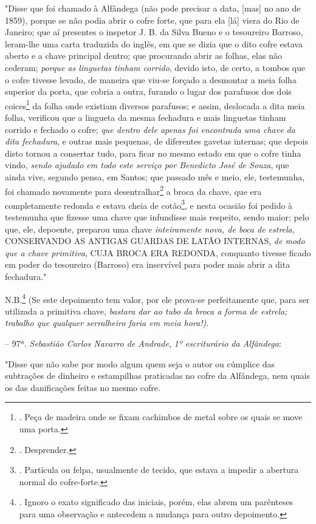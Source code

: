 "Disse que foi chamado à Alfândega (não pode precisar a data, {[}mas{]}
no ano de 1859), porque se não podia abrir o cofre forte, que para ela
{[}lá{]} viera do Rio de Janeiro; que aí presentes o inspetor J. B. da
Silva Bueno e o tesoureiro Barroso, leram-lhe uma carta traduzida do
inglês, em que se dizia que o dito cofre estava aberto e a chave
principal dentro; que procurando abrir as folhas, elas não cederam;
\emph{porque as linguetas tinham corrido}, devido isto, de certo, a
tombos que o cofre tivesse levado, de maneira que viu-se forçado a
desmontar a meia folha superior da porta, que cobria a outra, furando o
lugar dos parafusos dos dois coices\footnote{. Peça de madeira onde se
  fixam cachimbos de metal sobre os quais se move uma porta.} da folha
onde existiam diversos parafusos; e assim, deslocada a dita meia folha,
verificou que a lingueta da mesma fechadura e mais linguetas tinham
corrido e fechado o cofre; \emph{que dentro dele apenas foi encontrada
uma chave da dita fechadura}, e outras mais pequenas, de diferentes
gavetas internas; que depois disto tornou a consertar tudo, para ficar
no mesmo estado em que o cofre tinha vindo, \emph{sendo ajudado em todo
este serviço por Benedicto José de Souza}, que ainda vive, segundo
pensa, em Santos; que passado mês e meio, ele, testemunha, foi chamado
novamente para desentralhar\footnote{. Desprender.} a broca da chave,
que era completamente redonda e estava cheia de cotão\footnote{.
  Partícula ou felpa, usualmente de tecido, que estava a impedir a
  abertura normal do cofre-forte.}, e nesta ocasião foi pedido à
testemunha que fizesse uma chave que infundisse mais respeito, sendo
maior; pelo que, ele, depoente, preparou uma chave \emph{inteiramente
nova, de boca de estrela,} CONSERVANDO AS ANTIGAS GUARDAS DE LATÃO
INTERNAS, \emph{de modo que a chave primitiva}, CUJA BROCA ERA REDONDA,
conquanto tivesse ficado em poder do tesoureiro (Barroso) era inservível
para poder mais abrir a dita fechadura."

N.B.\footnote{. Ignoro o exato significado das iniciais, porém, elas
  abrem um parênteses para uma observação e antecedem a mudança para
  outro depoimento.} (Se este depoimento tem valor, por ele prova-se
perfeitamente que, para ser utilizada a primitiva chave, \emph{bastara
dar ao tubo da broca a forma de estrela; trabalho que qualquer
serralheiro faria em meia hora!)}.

-- 97ª. \emph{Sebastião Carlos Navarro de Andrade}, \emph{1º
escriturário da Alfândega}:

"Disse que não sabe por modo algum quem seja o autor ou cúmplice das
subtrações de dinheiro e estampilhas praticadas no cofre da Alfândega,
nem quais os das danificações feitas no mesmo cofre.

